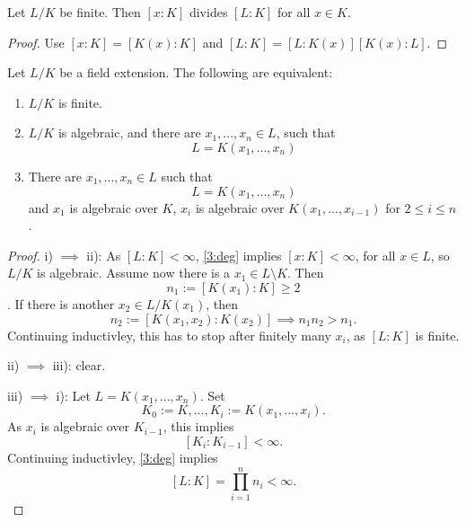 \begin{cor}
  Let $L/K$ be finite. Then $[x:K]$ divides $[L:K]$ for all $x\in K$.
\end{cor}
\begin{proof}
  Use $[x:K]=[K(x):K]$ and $[L:K]=[L:K(x)][K(x):L]$.
\end{proof}
\begin{thm}
  Let $L/K$ be a field extension. The following are equivalent:
  \begin{enumerate}
    \item $L/K$ is finite.
    \item $L/K$ is algebraic, and there are $x_1,...,x_n\in L$, such that
    \[
    L=K(x_1,...,x_n)
    \]
    \item There are $x_1,...,x_n\in L$ such that
    \[
    L=K(x_1,...,x_n)
    \]
    and $x_1$ is algebraic over $K$, $x_i$ is algebraic over $K(x_{1},...,x_{i-1})$ for $2\leq i \leq n$.
  \end{enumerate}
\end{thm}
\begin{proof}
   i) $\implies$ ii):  As $[L:K]<\infty$, \cref{3:deg} implies $[x:K]<\infty$, for all $x\in L$, so $L/K$ is algebraic. Assume now there is a $x_1\in L\setminus K$. Then
   \[
   n_1:= [K(x_1):K]\geq 2\].
   If there is another $x_2\in L/K(x_1)$, then
   \[
   n_2:= [K(x_1,x_2):K(x_2)]\implies n_1n_2>n_1.\]
   Continuing inductivley, this has to stop after finitely many $x_i$, as $[L:K]$ is finite.\par
   ii) $\implies$ iii): clear.\par
   iii) $\implies$ i): Let $L=K(x_1,...,x_n)$. Set
   \[
   K_0 := K, ..., K_i:=K(x_1,...,x_i).
   \]
   As $x_i$ is algebraic over $K_{i-1}$, this implies
   \[
   [K_i:K_{i-1}]<\infty .
   \]
   Continuing inductivley, \cref{3:deg} implies
   \[
   [L:K] = \prod_{i=1}^{n}n_i<\infty .
   \]
 \end{proof}

